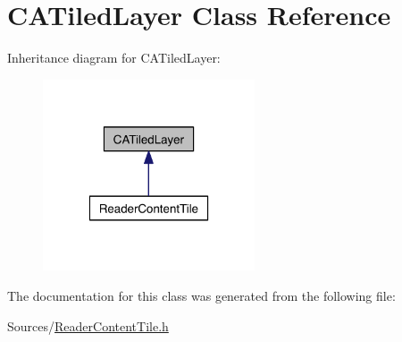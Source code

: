 \hypertarget{class_c_a_tiled_layer}{\section{C\-A\-Tiled\-Layer Class Reference}
\label{dd/dbf/class_c_a_tiled_layer}
}


Inheritance diagram for C\-A\-Tiled\-Layer\-:
\nopagebreak
\begin{figure}[H]
\begin{center}
\leavevmode
\includegraphics[width=178pt]{d1/d86/class_c_a_tiled_layer__inherit__graph}
\end{center}
\end{figure}


The documentation for this class was generated from the following file\-:\begin{DoxyCompactItemize}
\item 
Sources/\hyperlink{_reader_content_tile_8h}{Reader\-Content\-Tile.\-h}\end{DoxyCompactItemize}
